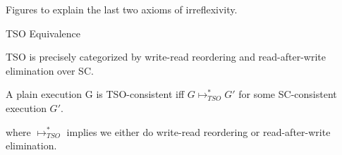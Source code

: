 \documentclass[xcolor={dvipsnames}, notes]{beamer}
\begin{document}
    \begin{frame}{Figures to explain the last two axioms of irreflexivity.}
            
        \begin{figure}
        \end{figure}

        \begin{figure}
        \end{figure}

    \end{frame}

    \begin{frame}{TSO Equivalence}

        TSO is precisely categorized by write-read reordering and read-after-write elimination over SC. 
        \begin{theorem}
            A plain execution G is TSO-consistent iff $G \longmapsto^{*}_{TSO} G'$ for some SC-consistent execution $G'$.
        \end{theorem}
        where $\longmapsto^{*}_{TSO}$ implies we either do write-read reordering or read-after-write elimination.
    
    \end{frame}
\end{document}
